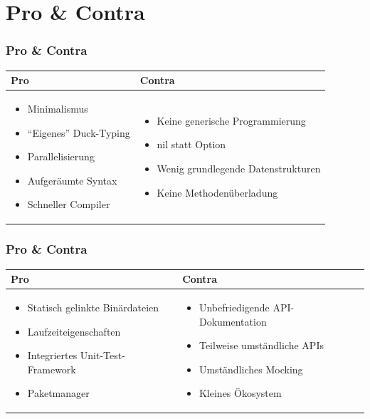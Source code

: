\documentclass{beamer}
\begin{document}
\section{Pro \& Contra}
\begin{frame}
\frametitle{Pro \& Contra}

\begin{tabular}{p{5cm} | p{5.5cm}}
\textbf{Pro} & \textbf{Contra} \\ \hline
\begin{itemize}
\setlength{\itemsep}{20pt}
\item Minimalismus
\item ``Eigenes'' Duck-Typing
\item Parallelisierung
\item Aufger\"aumte Syntax
\item Schneller Compiler
\end{itemize}
&
\begin{itemize}
\setlength{\itemsep}{20pt}
\item Keine generische Programmierung
\item nil statt Option
\item Wenig grundlegende Datenstrukturen
\item Keine Methodenüberladung
\end{itemize}
\\
\end{tabular}

\end{frame}

\begin{frame}
\frametitle{Pro \& Contra}

\begin{tabular}{p{5cm} | p{5.5cm}}
\textbf{Pro} & \textbf{Contra} \\ \hline
\begin{itemize}
\setlength{\itemsep}{20pt}
\item Statisch gelinkte Binärdateien
\item Laufzeiteigenschaften
\item Integriertes Unit-Test-Framework
\item Paketmanager
\end{itemize}
&
\begin{itemize}
\setlength{\itemsep}{20pt}
\item Unbefriedigende API-Dokumentation
\item Teilweise umständliche APIs
\item Umst\"andliches Mocking
\item Kleines \"Okosystem
\end{itemize}
\\
\end{tabular}

\end{frame}
\end{document}
